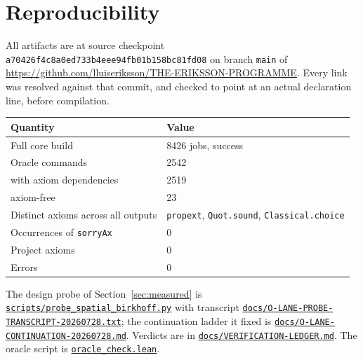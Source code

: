 \documentclass[11pt]{article}
\theoremstyle{definition}
\newcommand{\anchor}{a70426f4c8a0ed733b4eee94fb01b158bc81fd08}
\newcommand{\repofile}[2]{%
  \href{https://github.com/lluiseriksson/THE-ERIKSSON-PROGRAMME/blob/\anchor/#1}{\nolinkurl{#2}}}
\begin{document}
\section{Reproducibility}\label{sec:repro}

All artifacts are at source checkpoint \texttt{\anchor} on branch \texttt{main}
of \url{https://github.com/lluiseriksson/THE-ERIKSSON-PROGRAMME}.  Every link
was resolved against that commit, and checked to point at an actual declaration
line, before compilation.

\begin{center}
\begin{tabular}{ll}
\toprule
Quantity & Value \\
\midrule
Full core build & 8426 jobs, success \\
Oracle commands & 2542 \\
\quad with axiom dependencies & 2519 \\
\quad axiom-free & 23 \\
Distinct axioms across all outputs & \texttt{propext}, \texttt{Quot.sound}, \texttt{Classical.choice} \\
Occurrences of \texttt{sorryAx} & 0 \\
Project axioms & 0 \\
Errors & 0 \\
\bottomrule
\end{tabular}
\end{center}

The design probe of Section~\ref{sec:measured} is
\repofile{scripts/probe\_spatial\_birkhoff.py}{scripts/probe\_spatial\_birkhoff.py}
with transcript
\repofile{docs/O-LANE-PROBE-TRANSCRIPT-20260728.txt}{docs/O-LANE-PROBE-TRANSCRIPT-20260728.txt};
the continuation ladder it fixed is
\repofile{docs/O-LANE-CONTINUATION-20260728.md}{docs/O-LANE-CONTINUATION-20260728.md}.
Verdicts are in
\repofile{docs/VERIFICATION-LEDGER.md}{docs/VERIFICATION-LEDGER.md}.  The oracle
script is \repofile{oracle\_check.lean}{oracle\_check.lean}.
\end{document}
